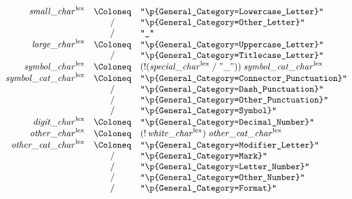 \begin{align*}
    \begin{array}{rcll}
        \mathit{small\_char}^\mathrm{lex}
        &\Coloneq &\texttt{"\textbackslash p\{General\_Category=Lowercase\_Letter\}"} \\
        &\mathrel{/} &\texttt{"\textbackslash p\{General\_Category=Other\_Letter\}"} \\
        &\mathrel{/} &\texttt{"\_"} \\
        \mathit{large\_char}^\mathrm{lex}
        &\Coloneq &\texttt{"\textbackslash p\{General\_Category=Uppercase\_Letter\}"} \\
        &\mathrel{/} &\texttt{"\textbackslash p\{General\_Category=Titlecase\_Letter\}"} \\
        \mathit{symbol\_char}^\mathrm{lex}
        &\Coloneq &(\mathop{!} (\mathit{special\_char}^\mathrm{lex} \mathrel{/} "\_"))\; \mathit{symbol\_cat\_char}^\mathrm{lex} \\
        \mathit{symbol\_cat\_char}^\mathrm{lex}
        &\Coloneq &\texttt{"\textbackslash p\{General\_Category=Connector\_Punctuation\}"} \\
        &\mathrel{/} &\texttt{"\textbackslash p\{General\_Category=Dash\_Punctuation\}"} \\
        &\mathrel{/} &\texttt{"\textbackslash p\{General\_Category=Other\_Punctuation\}"} \\
        &\mathrel{/} &\texttt{"\textbackslash p\{General\_Category=Symbol\}"} \\
        \mathit{digit\_char}^\mathrm{lex}
        &\Coloneq &\texttt{"\textbackslash p\{General\_Category=Decimal\_Number\}"} \\
        \mathit{other\_char}^\mathrm{lex}
        &\Coloneq &(\mathop{!} \mathit{white\_char}^\mathrm{lex})\; \mathit{other\_cat\_char}^\mathrm{lex} \\
        \mathit{other\_cat\_char}^\mathrm{lex}
        &\Coloneq &\texttt{"\textbackslash p\{General\_Category=Modifier\_Letter\}"} \\
        &\mathrel{/} &\texttt{"\textbackslash p\{General\_Category=Mark\}"} \\
        &\mathrel{/} &\texttt{"\textbackslash p\{General\_Category=Letter\_Number\}"} \\
        &\mathrel{/} &\texttt{"\textbackslash p\{General\_Category=Other\_Number\}"} \\
        &\mathrel{/} &\texttt{"\textbackslash p\{General\_Category=Format\}"}
    \end{array}
\end{align*}

